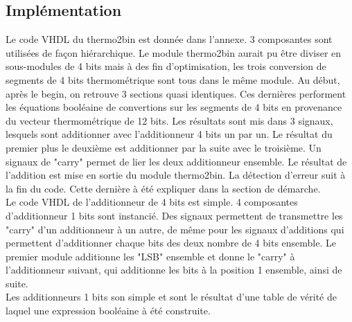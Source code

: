 \documentclass[a11paper]{article}
\begin{document}
\subsection{Implémentation}
Le code VHDL du thermo2bin est donnée dans l'annexe. 3 composantes sont utilisées de façon hiérarchique. Le module thermo2bin aurait pu
être diviser en sous-modules de 4 bits mais à des fin d'optimisation, les trois conversion de segments de 4 bits thermométrique sont tous
dans le même module. Au début, après le begin, on retrouve 3 sections quasi identiques. Ces dernières performent les équations booléaine
de convertions sur les segments de 4 bits en provenance du vecteur thermométrique de 12 bits. Les résultats sont mis dans 3 signaux,
lesquels sont additionner avec l'additionneur 4 bits un par un. Le résultat du premier plus le deuxième est additionner par la suite avec
le troisième. Un signaux de "carry" permet de lier les deux additionneur ensemble. Le résultat de l'addition est mise en sortie du module
thermo2bin. La détection d'erreur suit à la fin du code. Cette dernière à été expliquer dans la section de démarche.
\\
Le code VHDL de l'additionneur de 4 bits est simple. 4 composantes d'additionneur 1 bits sont instancié. Des signaux permettent de
transmettre les "carry" d'un additionneur à un autre, de même pour les signaux d'additions qui permettent d'additionner chaque bits des
deux nombre de 4 bits ensemble. Le premier module additionne les "LSB" ensemble et donne le "carry" à l'additionneur suivant, qui additionne
les bits à la position 1 ensemble, ainsi de suite.
\\
Les additionneurs 1 bits son simple et sont le résultat d'une table de vérité de laquel une expression booléaine à été construite.
\end{document}
